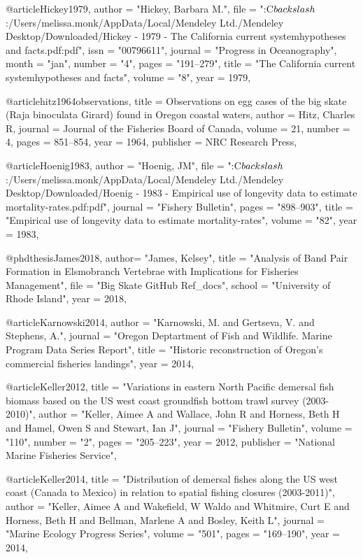 @article{Hickey1979,
    author = "{Hickey, Barbara M.}",
    file = "{:C$\\backslash$:/Users/melissa.monk/AppData/Local/Mendeley Ltd./Mendeley Desktop/Downloaded/Hickey - 1979 - The California current systemhypotheses and facts.pdf:pdf}",
    issn = "{00796611}",
    journal = "{Progress in Oceanography}",
    month = "jan",
    number = "{4}",
    pages = "{191--279}",
    title = "{{The California current systemhypotheses and facts}}",
    volume = "{8}",
    year = 1979,
}

@article{hitz1964observations,
  title = {Observations on egg cases of the big skate (Raja binoculata Girard) found in Oregon coastal waters},
  author = {Hitz, Charles R},
  journal = {Journal of the Fisheries Board of Canada},
  volume = {21},
  number = {4},
  pages = {851--854},
  year = 1964,
  publisher = {NRC Research Press},
}

@article{Hoenig1983,
    author = "{Hoenig, JM}",
    file = "{:C$\\backslash$:/Users/melissa.monk/AppData/Local/Mendeley Ltd./Mendeley Desktop/Downloaded/Hoenig - 1983 - Empirical use of longevity data to estimate mortality-rates.pdf:pdf}",
    journal = "{Fishery Bulletin}",
    pages = "{898--903}",
    title = "{{Empirical use of longevity data to estimate mortality-rates}}",
    volume = "{82}",
    year = 1983,
}

@phdthesis{James2018,
    author= "{James, Kelsey}",
    title = "{Analysis of Band Pair Formation in Elsmobranch Vertebrae with Implications for Fisheries Management}",
    file = "{Big Skate GitHub Ref_docs}",
    school = "{University of Rhode Island}",
    year = 2018,
}

@article{Karnowski2014,
    author = "{Karnowski, M. and Gertseva, V. and Stephens, A.}",
    journal = "{Oregon Deptartment of Fish and Wildlife. Marine Program Data Series Report}",
    title = "{{Historic reconstruction of Oregon's commercial fisheries landings}}",
    year = 2014,
}

@article{Keller2012,
    title = "{Variations in eastern North Pacific demersal fish biomass based on the US west coast groundfish bottom trawl survey (2003-2010)}",
    author = "{Keller, Aimee A and Wallace, John R and Horness, Beth H and Hamel, Owen S and Stewart, Ian J}",
    journal = "{Fishery Bulletin}",
    volume = "{110}",
    number = "{2}",
    pages = "{205--223}",
    year = 2012,
    publisher = "{National Marine Fisheries Service}",
}

@article{Keller2014,
    title = "{Distribution of demersal fishes along the US west coast (Canada to Mexico) in relation to spatial fishing closures (2003-2011)}",
    author = "{Keller, Aimee A and Wakefield, W Waldo and Whitmire, Curt E and Horness, Beth H and Bellman, Marlene A and Bosley, Keith L}",
    journal = "{Marine Ecology Progress Series}",
    volume = "{501}",
    pages = "{169--190}",
    year = 2014,
}


